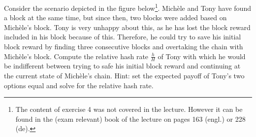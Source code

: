\documentclass[12pt]{article}
\begin{document}
	Consider the scenario depicted in the figure below\footnote{The content of exercise 4 was not covered in the lecture. However it can be found in the (exam relevant) book of the lecture on pages 163 (engl.) or 228 (de).}. Michèle and Tony have found a block at the same time, but since then, two blocks were added based on Michèle's block. Tony is very unhappy about this, as he has lost the block reward included in his block because of this. Therefore, he could try to save his initial block reward by finding three consecutive blocks and overtaking the chain with Michèle's block. Compute the relative hash rate $\frac{h}{H}$ of Tony with which he would be indifferent between trying to safe his initial block reward and continuing at the current state of Michèle's chain. Hint: set the expected payoff of Tony's two options equal and solve for the relative hash rate.
	
\end{document}
